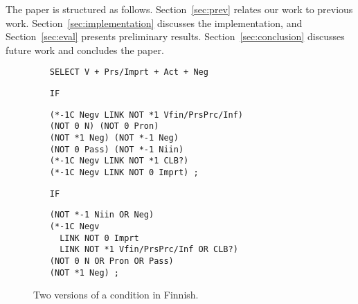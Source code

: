 The paper is structured as follows. Section~\ref{sec:prev} relates our
work to previous work. 
Section~\ref{sec:implementation} discusses the implementation, and
Section~\ref{sec:eval} presents preliminary results. 
Section~\ref{sec:conclusion} discusses future work and concludes the paper.


\begin{figure}[t]
\centering
\begin{itemize}

\item[]\texttt{SELECT V + Prs/Imprt + Act + Neg}

\item[\texttt{IF}]
\begin{verbatim}(*-1C Negv LINK NOT *1 Vfin/PrsPrc/Inf) 
(NOT 0 N) (NOT 0 Pron) 
(NOT *1 Neg) (NOT *-1 Neg)
(NOT 0 Pass) (NOT *-1 Niin) 
(*-1C Negv LINK NOT *1 CLB?) 
(*-1C Negv LINK NOT 0 Imprt) ; 
\end{verbatim}

\item[\texttt{IF}]
\begin{verbatim}(NOT *-1 Niin OR Neg)  
(*-1C Negv
  LINK NOT 0 Imprt
  LINK NOT *1 Vfin/PrsPrc/Inf OR CLB?) 
(NOT 0 N OR Pron OR Pass) 
(NOT *1 Neg) ;
\end{verbatim}
\end{itemize}

\caption{Two versions of a condition in Finnish.}

\label{fig:regroup}
\end{figure}







